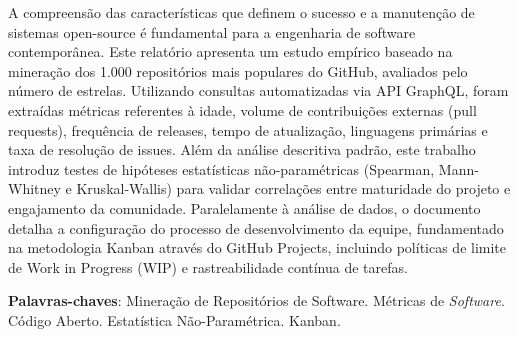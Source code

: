 \documentclass[
	article,			%
	11pt,				%
	oneside,			%
	a4paper,			%
	english,			%
	brazil,				%
	sumario=tradicional
	]{abntex2}
\begin{document}
\frenchspacing 


%
%
\maketitle

\begin{resumoumacoluna}
A compreensão das características que definem o sucesso e a manutenção de sistemas open-source é fundamental para a engenharia de software contemporânea. Este relatório apresenta um estudo empírico baseado na mineração dos 1.000 repositórios mais populares do GitHub, avaliados pelo número de estrelas. Utilizando consultas automatizadas via API GraphQL, foram extraídas métricas referentes à idade, volume de contribuições externas (pull requests), frequência de releases, tempo de atualização, linguagens primárias e taxa de resolução de issues. Além da análise descritiva padrão, este trabalho introduz testes de hipóteses estatísticas não-paramétricas (Spearman, Mann-Whitney e Kruskal-Wallis) para validar correlações entre maturidade do projeto e engajamento da comunidade. Paralelamente à análise de dados, o documento detalha a configuração do processo de desenvolvimento da equipe, fundamentado na metodologia Kanban através do GitHub Projects, incluindo políticas de limite de Work in Progress (WIP) e rastreabilidade contínua de tarefas. 
 \vspace{\onelineskip}
 
 \noindent
 \textbf{Palavras-chaves}: Mineração de Repositórios de Software. Métricas de \textit{Software}. Código Aberto. Estatística Não-Paramétrica. Kanban.
\end{resumoumacoluna}


\textual

\end{document}
